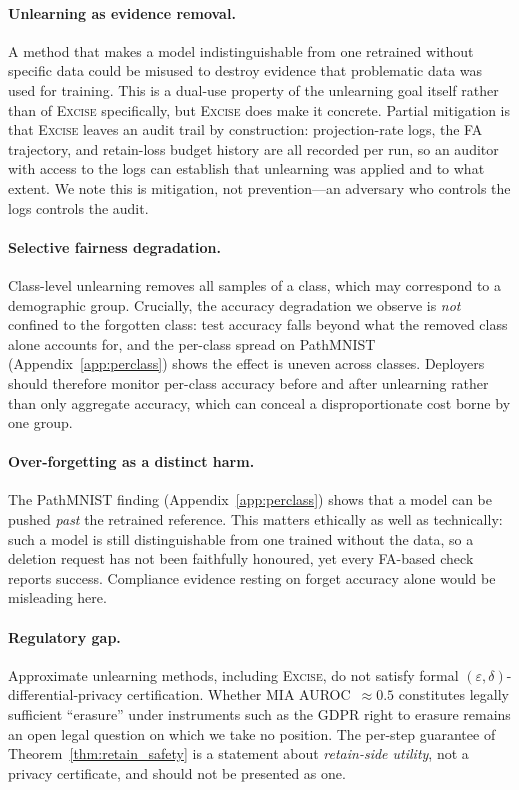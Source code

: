 \documentclass{article}
\newcommand{\ours}{\textsc{Excise}}
\theoremstyle{remark}
\theoremstyle{plain}
\begin{document}
\paragraph{Unlearning as evidence removal.}
A method that makes a model indistinguishable from one retrained without
specific data could be misused to destroy evidence that problematic data was
used for training. This is a dual-use property of the unlearning goal itself
rather than of \ours{} specifically, but \ours{} does make it concrete. Partial
mitigation is that \ours{} leaves an audit trail by construction: projection-rate
logs, the FA trajectory, and retain-loss budget history are all recorded per run,
so an auditor with access to the logs can establish that unlearning was applied
and to what extent. We note this is mitigation, not prevention---an adversary who
controls the logs controls the audit.

\paragraph{Selective fairness degradation.}
Class-level unlearning removes all samples of a class, which may correspond to a
demographic group. Crucially, the accuracy degradation we observe is
\emph{not} confined to the forgotten class: test accuracy falls beyond what the
removed class alone accounts for, and the per-class spread on PathMNIST
(Appendix~\ref{app:perclass}) shows the effect is uneven across classes.
Deployers should therefore monitor per-class accuracy before and after
unlearning rather than only aggregate accuracy, which can conceal a
disproportionate cost borne by one group.

\paragraph{Over-forgetting as a distinct harm.}
The PathMNIST finding (Appendix~\ref{app:perclass}) shows that a model can be
pushed \emph{past} the retrained reference. This matters ethically as well as
technically: such a model is still distinguishable from one trained without the
data, so a deletion request has not been faithfully honoured, yet every
FA-based check reports success. Compliance evidence resting on forget accuracy
alone would be misleading here.

\paragraph{Regulatory gap.}
Approximate unlearning methods, including \ours{}, do not satisfy formal
$(\varepsilon,\delta)$-differential-privacy certification. Whether
MIA AUROC~$\approx 0.5$ constitutes legally sufficient ``erasure'' under
instruments such as the GDPR right to erasure remains an open legal question on
which we take no position. The per-step guarantee of
Theorem~\ref{thm:retain_safety} is a statement about \emph{retain-side utility},
not a privacy certificate, and should not be presented as one.
\end{document}
